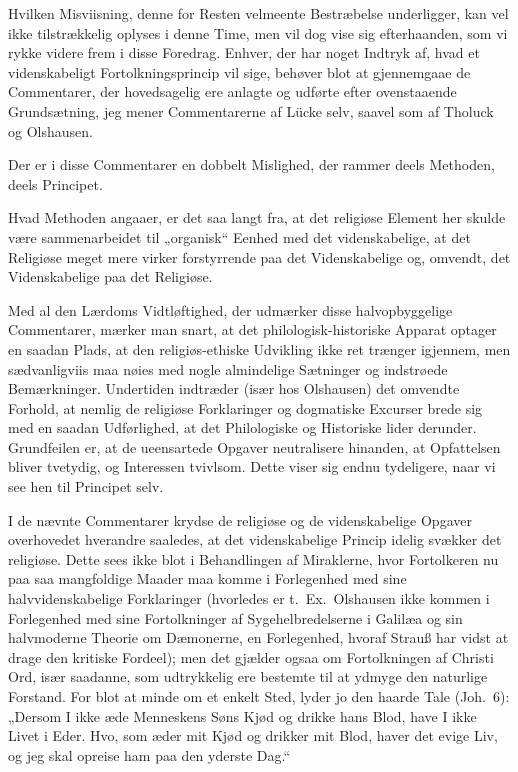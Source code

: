 \documentclass[12pt,a4paper]{book}
\newcommand{\opage}[1]{\marginnote{\footnotesize\textit{[#1]}}}
\begin{document}
Hvilken Misviisning, denne for Resten velmeente Bestræbelse underligger,
kan vel ikke tilstrækkelig oplyses i denne Time, men vil dog vise sig
efterhaanden, som vi rykke videre frem i disse Foredrag. Enhver, der har
noget Indtryk af, hvad et videnskabeligt Fortolkningsprincip vil sige,
behøver blot at gjennemgaae de Commentarer, der hovedsagelig ere anlagte
og udførte efter ovenstaaende Grundsætning, jeg mener Commentarerne af
Lücke selv, saavel som af Tholuck og Olshausen.

Der er i disse Commentarer en dobbelt Mislighed, der rammer deels
Methoden, deels Principet.

Hvad Methoden angaaer, er det saa langt fra, at det religiøse Element her
skulde være sammenarbeidet til „organisk“ Eenhed med det videnskabelige,
at det Religiøse meget mere virker forstyrrende paa det Videnskabelige
og, omvendt, det Videnskabelige paa det Religiøse.

Med al den Lærdoms Vidtløftighed, der udmærker disse halvopbyggelige
Commentarer, mærker man snart, at det philologisk-historiske Apparat
optager en saadan Plads, at den religiøs-ethiske Udvikling ikke ret
trænger igjennem, men sædvanligviis maa nøies med nogle almindelige
Sætninger og indstrøede Bemærkninger. Undertiden indtræder (især hos
Olshausen) det omvendte Forhold, at nemlig de religiøse Forklaringer og
dogmatiske Excurser brede sig med en saadan Udførlighed, at det
Philologiske og Historiske lider derunder. Grundfeilen er, at de
ueensartede Opgaver neutralisere hinanden, at Opfattelsen bliver
tvetydig, og Interessen tvivlsom. Dette viser sig endnu tydeligere, naar
vi see hen til Principet selv.

I de nævnte Commentarer krydse de religiøse og de videnskabelige Opgaver
overhovedet hverandre saaledes, at det videnskabelige Princip idelig
svækker det religiøse. Dette sees ikke blot i
\opage{63} Behandlingen af Miraklerne, hvor Fortolkeren nu paa saa mangfoldige
Maader maa komme i Forlegenhed med sine halvvidenskabelige Forklaringer
(hvorledes er t.\ Ex.\ Olshausen ikke kommen i Forlegenhed med sine
Fortolkninger af Sygehelbredelserne i Galilæa og sin halvmoderne Theorie
om Dæmonerne, en Forlegenhed, hvoraf Strauß har vidst at drage den
kritiske Fordeel); men det gjælder ogsaa om Fortolkningen af Christi Ord,
især saadanne, som udtrykkelig ere bestemte til at ydmyge den naturlige
Forstand. For blot at minde om et enkelt Sted, lyder jo den haarde Tale
(Joh.\ 6): „Dersom I ikke æde Menneskens Søns Kjød og drikke hans Blod,
have I ikke Livet i Eder. Hvo, som æder mit Kjød og drikker mit Blod,
haver det evige Liv, og jeg skal opreise ham paa den yderste Dag.“
\end{document}
